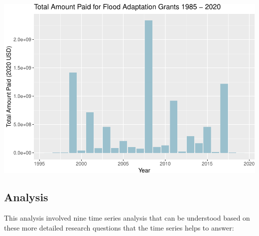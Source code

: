 \documentclass[
  12pt,
]{article}
\begin{document}
\includegraphics{finalreport_files/figure-latex/unnamed-chunk-4-1.pdf}

\newpage

\hypertarget{analysis}{%
\subsection{Analysis}\label{analysis}}

This analysis involved nine time series analysis that can be understood
based on these more detailed research questions that the time series
helps to answer:
\end{document}
